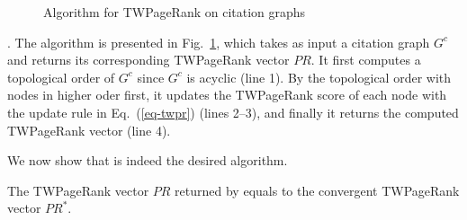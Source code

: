 {%
\begin{figure}[tb!]
\begin{center}
{\small
\begin{minipage}{3.36in}
\myhrule \vspace{-2ex}
\vspace{-3ex} \myhrule
\end{minipage}
}
\end{center}
\vspace{-3ex}
\caption{\small Algorithm for TWPageRank on citation graphs} \label{alg-TWPageRank-citation}
\vspace{-3ex}
\end{figure}






. The algorithm is presented in Fig.~\ref{alg-TWPageRank-citation}, which takes as input a citation graph $G^c$ and returns its corresponding TWPageRank vector $PR$. It first computes a topological order of $G^c$ since $G^c$ is acyclic (line 1).
By the topological order with nodes in higher oder first, it updates the TWPageRank score of each node with the update rule in Eq.~(\ref{eq-twpr}) (lines 2--3), and finally  it returns the computed TWPageRank vector (line 4).


We now show that \twprdag is indeed the desired algorithm.

\begin{lemma}
\label{prop-nonitercomputing}
The TWPageRank vector $PR$ returned by \twprdag equals to the convergent TWPageRank vector $PR^*$.
\end{lemma}

}

